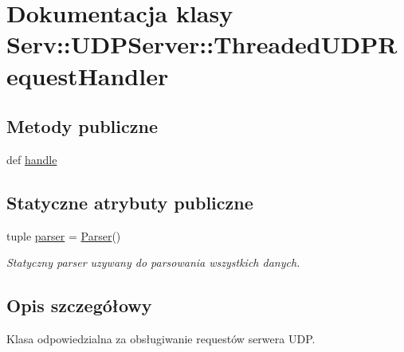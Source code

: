 \hypertarget{class_serv_1_1_u_d_p_server_1_1_threaded_u_d_p_request_handler}{
\section{Dokumentacja klasy Serv::UDPServer::ThreadedUDPRequestHandler}
\label{class_serv_1_1_u_d_p_server_1_1_threaded_u_d_p_request_handler}
}
\subsection*{Metody publiczne}
\begin{DoxyCompactItemize}
\item 
def \hyperlink{class_serv_1_1_u_d_p_server_1_1_threaded_u_d_p_request_handler_a94afb499da79b188e658f8b2d4bffb9a}{handle}
\end{DoxyCompactItemize}
\subsection*{Statyczne atrybuty publiczne}
\begin{DoxyCompactItemize}
\item 
tuple \hyperlink{class_serv_1_1_u_d_p_server_1_1_threaded_u_d_p_request_handler_ac0a5ee1efde591fb33de85283b9b4d3f}{parser} = \hyperlink{class_serv_1_1_parser_1_1_parser}{Parser}()
\begin{DoxyCompactList}\small\item\em Statyczny parser uzywany do parsowania wszystkich danych. \item\end{DoxyCompactList}\end{DoxyCompactItemize}


\subsection{Opis szczegółowy}
\begin{DoxyVerb}Klasa odpowiedzialna za obsługiwanie requestów serwera UDP.\end{DoxyVerb}
 


